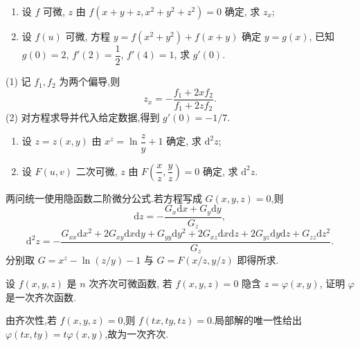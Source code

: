 \begin{example}
    \begin{enumerate}
        \item 设 $f$ 可微, $z$ 由 $f(x+y+z,x^2+y^2+z^2)=0$ 确定, 求 $z_x$;
        \item 设 $f(u)$ 可微, 方程 $y=f(x^2+y^2)+f(x+y)$ 确定 $y=g(x)$, 已知 $g(0)=2$, $f'(2)=\dfrac{1}{2}$, $f'(4)=1$, 求 $g'(0)$.
    \end{enumerate}
\end{example}
\exampleblank

\begin{solution}

    (1) 记 $f_1,f_2$ 为两个偏导,则
    \[
        z_x=-\dfrac{f_1+2xf_2}{f_1+2zf_2}.
    \]
    (2) 对方程求导并代入给定数据,得到 $g'(0)=-1/7$.
\end{solution}

\begin{example}
    \begin{enumerate}
        \item 设 $z=z(x,y)$ 由 $\displaystyle x^z=\ln\dfrac{z}{y}+1$ 确定, 求 $\mathrm{d}^2z$;
        \item 设 $F(u,v)$ 二次可微, $z$ 由 $\displaystyle F\left(\dfrac{x}{z},\dfrac{y}{z}\right)=0$ 确定, 求 $\mathrm{d}^2z$.
    \end{enumerate}
\end{example}
\exampleblank

\begin{solution}
    两问统一使用隐函数二阶微分公式.若方程写成 $G(x,y,z)=0$,则
    \[
        \mathrm dz=-\dfrac{G_x\mathrm dx+G_y\mathrm dy}{G_z},
    \]
    \[
        \mathrm d^2z=-\dfrac{G_{xx}\mathrm dx^2+2G_{xy}\mathrm dx\mathrm dy+G_{yy}\mathrm dy^2
            +2G_{xz}\mathrm dx\mathrm dz+2G_{yz}\mathrm dy\mathrm dz+G_{zz}\mathrm dz^2}{G_z}.
    \]
    分别取 $G=x^z-\ln(z/y)-1$ 与 $G=F(x/z,y/z)$ 即得所求.
\end{solution}

\begin{example}
    设 $f(x,y,z)$ 是 $n$ 次齐次可微函数, 若 $f(x,y,z)=0$ 隐含 $z=\varphi(x,y)$, 证明 $\varphi$ 是一次齐次函数.
\end{example}
\exampleblank

\begin{solution}
    由齐次性,若 $f(x,y,z)=0$,则 $f(tx,ty,tz)=0$.局部解的唯一性给出 $\varphi(tx,ty)=t\varphi(x,y)$,故为一次齐次.
\end{solution}

